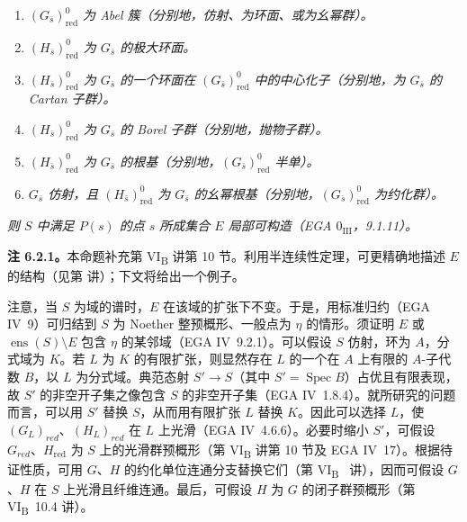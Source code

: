 \begin{enumerate}
\renewcommand{\labelenumi}{\textup{\roman{enumi})}}
\item \emph{\((G_{\bar s})^{0}_{\mathrm{red}}\) 为 Abel 簇（分别地，仿射、为环面、或为幺幂群）。}
\item \emph{\((H_{\bar s})^{0}_{\mathrm{red}}\) 为 \(G_{\bar s}\) 的极大环面。}
\item{} \emph{\((H_{\bar s})^{0}_{\mathrm{red}}\) 为 \(G_{\bar s}\) 的一个环面在 \((G_{\bar s})^{0}_{\mathrm{red}}\) 中的中心化子（分别地，为 \(G_{\bar s}\) 的 Cartan 子群）。}
\item \emph{\((H_{\bar s})^{0}_{\mathrm{red}}\) 为 \(G_{\bar s}\) 的 Borel 子群（分别地，抛物子群）。}
\item \emph{\((H_{\bar s})^{0}_{\mathrm{red}}\) 为 \(G_{\bar s}\) 的根基（分别地，\((G_{\bar s})^{0}_{\mathrm{red}}\) 半单）。}
\item \emph{\(G_{\bar s}\) 仿射，且 \((H_{\bar s})^{0}_{\mathrm{red}}\) 为 \(G_{\bar s}\) 的幺幂根基（分别地，\((G_{\bar s})^{0}_{\mathrm{red}}\) 为约化群）。}
\end{enumerate}

\emph{则 \(S\) 中满足 \(P(s)\) 的点 \(s\) 所成集合 \(E\) 局部可构造（EGA \(0_{\mathrm{III}}\)，9.1.11）。}

\textbf{注 6.2.1。}本命题补充第 VI\textsubscript{B} 讲第 10 节。利用半连续性定理，可更精确地描述 \(E\) 的结构（见第  讲）；下文将给出一个例子。

注意，当 \(S\) 为域的谱时，\(E\) 在该域的扩张下不变。于是，用标准归约（EGA IV~9）可归结到 \(S\) 为 Noether 整预概形、一般点为 \(\eta\) 的情形。须证明 \(E\) 或 \(\operatorname{ens}(S)\setminus E\) 包含 \(\eta\) 的某邻域（EGA IV~9.2.1）。可以假设 \(S\) 仿射，环为 \(A\)，分式域为 \(K\)。若 \(L\) 为 \(K\) 的有限扩张，则显然存在 \(L\) 的一个在 \(A\) 上有限的 \(A\)-子代数 \(B\)，以 \(L\) 为分式域。典范态射 \(S'\to S\)（其中 \(S'=\operatorname{Spec}B\)）占优且有限表现，故 \(S'\) 的非空开子集之像包含 \(S\) 的非空开子集（EGA IV~1.8.4）。就所研究的问题而言，可以用 \(S'\) 替换 \(S\)，从而用有限扩张 \(L\) 替换 \(K\)。因此可以选择 \(L\)，使 \((G_{L})_{red}\)、\((H_{L})_{red}\) 在 \(L\) 上光滑（EGA IV~4.6.6）。必要时缩小 \(S'\)，可假设 \(G_{red}\)、\(H_{\mathrm{red}}\) 为 \(S\) 上的光滑群预概形（第 VI\textsubscript{B} 讲第 10 节及 EGA IV~17）。根据待证性质，可用 \(G\)、\(H\) 的约化单位连通分支替换它们（第 VI\textsubscript{B}~ 讲），因而可假设 \(G\)、\(H\) 在 \(S\) 上光滑且纤维连通。最后，可假设 \(H\) 为 \(G\) 的闭子群预概形（第 VI\textsubscript{B}~10.4 讲）。

